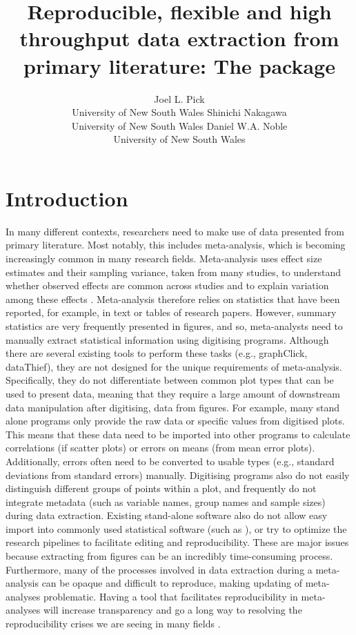 \documentclass[article]{jss}
\author{Joel L. Pick\\University of New South Wales
   \And Shinichi Nakagawa\\University of New South Wales
   \AND Daniel W.A. Noble\\University of New South Wales
   }
\title{Reproducible, flexible and high throughput data extraction from primary literature: The \pkg{metaDigitise} \proglang{R} package}
\begin{document}
\section{Introduction}
In many different contexts, researchers need to make use of data presented from primary literature. Most notably, this includes meta-analysis, which is becoming increasingly common in many research fields. Meta-analysis uses effect size estimates and their sampling variance, taken from many studies, to understand whether observed effects are common across studies and to explain variation among these effects \citep{Naka2017, Glass1976, Koricheva2013, Borenstein2009}. Meta-analysis therefore relies on statistics that have been reported, for example, in text or tables of research papers. However, summary statistics are very frequently presented in figures, and so, meta-analysts need to manually extract statistical information using digitising programs. Although there are several existing tools to perform these tasks (e.g., graphClick, dataThief), they are not designed for the unique requirements of meta-analysis. Specifically, they do not differentiate between common plot types that can be used to present data, meaning that they require a large amount of downstream data manipulation after digitising, data from figures. For example, many stand alone programs only provide the raw data or specific values from digitised plots. This means that these data need to be imported into other programs to calculate correlations (if scatter plots) or errors on means (from mean error plots). Additionally, errors often need to be converted to usable types (e.g., standard deviations from standard errors) manually. Digitising programs also do not easily distinguish different groups of points within a plot, and frequently do not integrate metadata (such as variable names, group names and sample sizes) during data extraction. Existing stand-alone software also do not allow easy import into commonly used statistical software (such as ), or try to optimize the research pipelines to facilitate editing and reproducibility. These are major issues because extracting from figures can be an incredibly time-consuming process. Furthermore, many of the processes involved in data extraction during a meta-analysis can be opaque and difficult to reproduce, making updating of meta-analyses problematic. Having a tool that facilitates reproducibility in meta-analyses will increase transparency and go a long way to resolving the reproducibility crises we are seeing in many fields \citep{peng_reproducible_2006, peng_reproducible_2011, sandve_ten_2013}.
\end{document}
